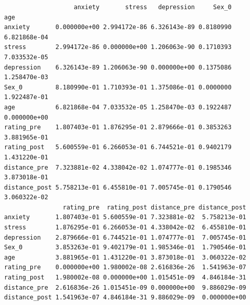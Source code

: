 \documentclass[
  letterpaper,
  DIV=11,
  numbers=noendperiod]{scrartcl}
\newenvironment{Shaded}{\begin{snugshade}}{\end{snugshade}}
\newcommand{\AttributeTok}[1]{\textcolor[rgb]{0.40,0.45,0.13}{#1}}
\newcommand{\ConstantTok}[1]{\textcolor[rgb]{0.56,0.35,0.01}{#1}}
\newcommand{\ControlFlowTok}[1]{\textcolor[rgb]{0.00,0.23,0.31}{\textbf{#1}}}
\newcommand{\DecValTok}[1]{\textcolor[rgb]{0.68,0.00,0.00}{#1}}
\newcommand{\FunctionTok}[1]{\textcolor[rgb]{0.28,0.35,0.67}{#1}}
\newcommand{\NormalTok}[1]{\textcolor[rgb]{0.00,0.23,0.31}{#1}}
\newcommand{\OtherTok}[1]{\textcolor[rgb]{0.00,0.23,0.31}{#1}}
\newcommand{\SpecialCharTok}[1]{\textcolor[rgb]{0.37,0.37,0.37}{#1}}
\newcommand{\StringTok}[1]{\textcolor[rgb]{0.13,0.47,0.30}{#1}}
\begin{document}
\begin{Shaded}
\end{Shaded}

\begin{verbatim}
                   anxiety       stress   depression     Sex_0          age
anxiety       0.000000e+00 2.994172e-86 6.326143e-89 0.8180990 6.821868e-04
stress        2.994172e-86 0.000000e+00 1.206063e-90 0.1710393 7.033532e-05
depression    6.326143e-89 1.206063e-90 0.000000e+00 0.1375086 1.258470e-03
Sex_0         8.180990e-01 1.710393e-01 1.375086e-01 0.0000000 1.922487e-01
age           6.821868e-04 7.033532e-05 1.258470e-03 0.1922487 0.000000e+00
rating_pre    1.807403e-01 1.876295e-01 2.879666e-01 0.3853263 3.881965e-01
rating_post   5.600559e-01 6.266053e-01 6.744521e-01 0.9402179 1.431220e-01
distance_pre  7.323881e-02 4.338042e-02 1.074777e-01 0.1985346 3.873018e-01
distance_post 5.758213e-01 6.455810e-01 7.005745e-01 0.1790546 3.060322e-02
                rating_pre  rating_post distance_pre distance_post
anxiety       1.807403e-01 5.600559e-01 7.323881e-02  5.758213e-01
stress        1.876295e-01 6.266053e-01 4.338042e-02  6.455810e-01
depression    2.879666e-01 6.744521e-01 1.074777e-01  7.005745e-01
Sex_0         3.853263e-01 9.402179e-01 1.985346e-01  1.790546e-01
age           3.881965e-01 1.431220e-01 3.873018e-01  3.060322e-02
rating_pre    0.000000e+00 1.980002e-08 2.616836e-26  1.541963e-07
rating_post   1.980002e-08 0.000000e+00 1.015451e-09  4.846184e-31
distance_pre  2.616836e-26 1.015451e-09 0.000000e+00  9.886029e-09
distance_post 1.541963e-07 4.846184e-31 9.886029e-09  0.000000e+00
\end{verbatim}
\end{document}
